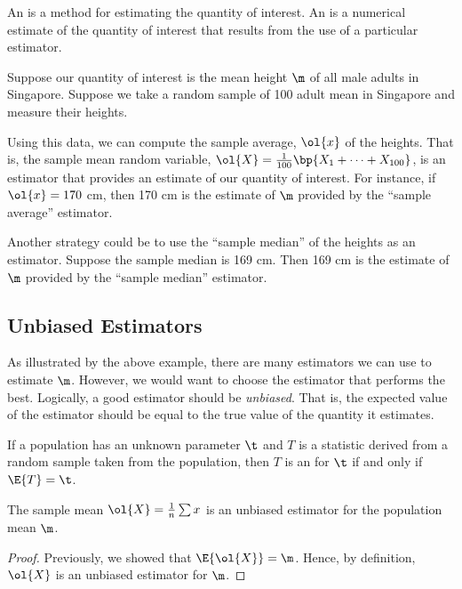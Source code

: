 \begin{definition}
    An  is a method for estimating the quantity of interest. An  is a numerical estimate of the quantity of interest that results from the use of a particular estimator.
\end{definition}

\begin{example}
    Suppose our quantity of interest is the mean height $\m$ of all male adults in Singapore. Suppose we take a random sample of 100 adult mean in Singapore and measure their heights.
    
    Using this data, we can compute the sample average, $\ol{x}$ of the heights. That is, the sample mean random variable, $\ol{X} = \frac1{100} \bp{X_1 + \dots + X_{100}}$, is an estimator that provides an estimate of our quantity of interest. For instance, if $\ol{x} = 170$ cm, then 170 cm is the estimate of $\m$ provided by the ``sample average'' estimator.

    Another strategy could be to use the ``sample median'' of the heights as an estimator. Suppose the sample median is 169 cm. Then 169 cm is the estimate of $\m$ provided by the ``sample median'' estimator.
\end{example}

\subsection{Unbiased Estimators}

As illustrated by the above example, there are many estimators we can use to estimate $\m$. However, we would want to choose the estimator that performs the best. Logically, a good estimator should be \emph{unbiased}. That is, the expected value of the estimator should be equal to the true value of the quantity it estimates. 

\begin{definition}
    If a population has an unknown parameter $\t$ and $T$ is a statistic derived from a random sample taken from the population, then $T$ is an  for $\t$ if and only if $\E{T} = \t$.
\end{definition}

\begin{proposition}
    The sample mean $\ol{X} = \frac1n \sum x$ is an unbiased estimator for the population mean $\m$.
\end{proposition}
\begin{proof}
    Previously, we showed that $\E{\ol{X}} = \m$. Hence, by definition, $\ol{X}$ is an unbiased estimator for $\m$.
\end{proof}

